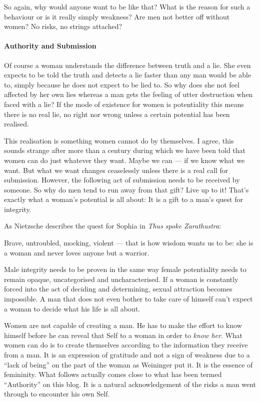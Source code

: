 So again, why would anyone want to be like that? What is the reason for such a behaviour or is it really simply weakness? Are men not better off without women? No risks, no strings attached?

\paragraph{Authority and Submission}
Of course a woman understands the difference between truth and a lie. She even expects to be told the truth and detects a lie faster than any man would be able to, simply because he does not expect to be lied to. So why does she not feel affected by her own lies whereas a man gets the feeling of utter destruction when faced with a lie? If the mode of existence for women is potentiality this means there is no real lie, no right nor wrong unless a certain potential has been realised.

This realisation is something women cannot do by themselves. I agree, this sounds strange after more than a century during which we have been told that women can do just whatever they want. Maybe we can — if we know what we want. But what we want changes ceaselessly unless there is a real call for submission. However, the following act of submission needs to be received by someone. So why do men tend to run away from that gift? Live up to it! That's exactly what a woman's potential is all about: It is a gift to a man's quest for integrity.

As Nietzsche describes the quest for Sophia in \emph{Thus spoke Zarathustra}:

\begin{quotex}
Brave, untroubled, mocking, violent — that is how wisdom wants us to be: she is a woman and never loves anyone but a warrior. 

\end{quotex}
Male integrity needs to be proven in the same way female potentiality needs to remain opaque, uncategorised and uncharacterised. If a woman is constantly forced into the act of deciding and determining, sexual attraction becomes impossible. A man that does not even bother to take care of himself can't expect a woman to decide what his life is all about.

Women are not capable of creating a man. He has to make the effort to know himself before he can reveal that Self to a woman in order to \emph{know her}. What women can do is to create themselves according to the information they receive from a man. It is an expression of gratitude and not a sign of weakness due to a “lack of being” on the part of the woman as Weininger put it. It is the essence of femininity. What follows actually comes close to what has been termed “Authority” on this blog. It is a natural acknowledgement of the risks a man went through to encounter his own Self.

